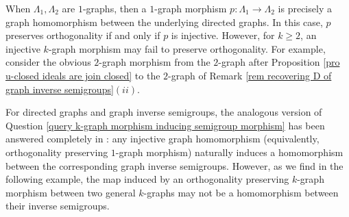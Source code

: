 \documentclass[a4paper,reqno,11pt]{amsart}
\numberwithin{equation}{section}
\theoremstyle{definition}
\theoremstyle{remark}
\begin{document}
When $\Lambda_1,\Lambda_2$ are $1$-graphs, then a $1$-graph morphism $p:\Lambda_1\longrightarrow \Lambda_2$ is precisely a graph homomorphism between the underlying directed graphs. In this case, $p$ preserves orthogonality if and only if $p$ is injective. However, for $k\ge 2$, an injective $k$-graph morphism may fail to preserve orthogonality. For example, consider the obvious $2$-graph morphism from the $2$-graph after Proposition \ref{pro u-closed ideals are join closed} to the $2$-graph of Remark \ref{rem recovering D of graph inverse semigroups}$(ii)$.

For directed graphs and graph inverse semigroups, the analogous version of Question \ref{query k-graph morphism inducing semigroup morphism} has been answered completely in \cite[Theorem 20]{Mesyan}: any injective graph homomorphism (equivalently, orthogonality preserving $1$-graph morphism) naturally induces a homomorphism between the corresponding graph inverse semigroups. However, as we find in the following example, the map induced by an orthogonality preserving $k$-graph morphism between two general $k$-graphs may not be a homomorphism between their inverse semigroups.
\end{document}
